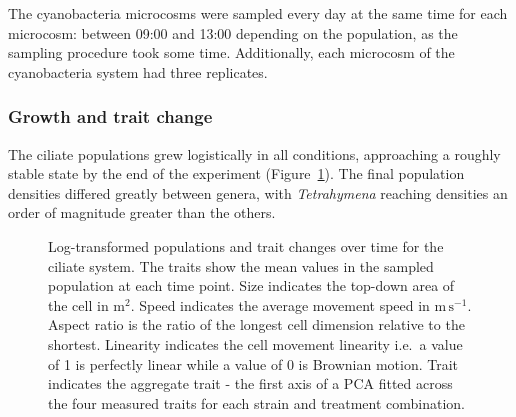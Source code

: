 \documentclass[
  letterpaper,
  DIV=11,
  numbers=noendperiod]{scrartcl}
\begin{document}
The cyanobacteria microcosms were sampled every day at the same time for
each microcosm: between 09:00 and 13:00 depending on the population, as
the sampling procedure took some time. Additionally, each microcosm of
the cyanobacteria system had three replicates.

\subsubsection{Growth and trait change}\label{growth-and-trait-change}

The ciliate populations grew logistically in all conditions, approaching
a roughly stable state by the end of the experiment
(Figure~\ref{fig-cilia-pop-traits-time}). The final population densities
differed greatly between genera, with \emph{Tetrahymena} reaching
densities an order of magnitude greater than the others.

\begin{figure}


\caption{\label{fig-cilia-pop-traits-time}Log-transformed populations
and trait changes over time for the ciliate system. The traits show the
mean values in the sampled population at each time point. Size indicates
the top-down area of the cell in \textmu\(\mathrm{m}^{2}\). Speed
indicates the average movement speed in \textmu\(\mathrm{m \, s}^{-1}\).
Aspect ratio is the ratio of the longest cell dimension relative to the
shortest. Linearity indicates the cell movement linearity i.e.~a value
of 1 is perfectly linear while a value of 0 is Brownian motion. Trait
indicates the aggregate trait - the first axis of a PCA fitted across
the four measured traits for each strain and treatment combination.}

\end{figure}%
\end{document}
